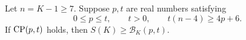 \begin{proposition}\label{prop:transfer}
Let $n=K-1\ge7$. Suppose $p,t$ are real numbers satisfying
\[
 0\le p\le t,\qquad t>0,\qquad t(n-4)\ge4p+6.
\]
If $\operatorname{CP}(p,t)$ holds, then $S(K)\ge\mathcal B_K(p,t)$.
\end{proposition}
